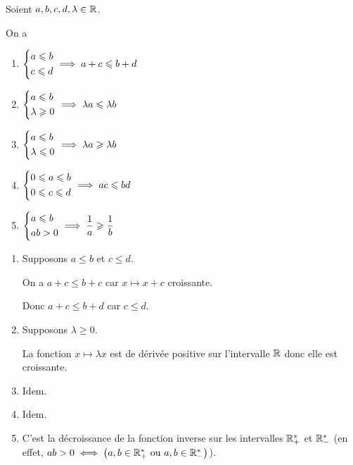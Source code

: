 \begin{prop}
Soient \(a,b,c,d,\lambda\in\mathbb{R}\).

On a \begin{enumerate}
\item \(\begin{dcases}a\leqslant b \\ c\leqslant d\end{dcases}\implies a+c\leqslant b+d\)

\item \(\begin{dcases}a\leqslant b \\ \lambda\geqslant0\end{dcases}\implies\lambda a\leqslant\lambda b\)

\item \(\begin{dcases}a\leqslant b \\ \lambda\leqslant0\end{dcases}\implies\lambda a\geqslant\lambda b\)

\item \(\begin{dcases}0\leqslant a\leqslant b \\ 0\leqslant c\leqslant d\end{dcases}\implies ac\leqslant bd\)

\item \(\begin{dcases}a\leqslant b \\ ab>0\end{dcases}\implies\dfrac{1}{a}\geqslant\dfrac{1}{b}\)
\end{enumerate}
\end{prop}

\begin{dem}
\begin{enumerate}
\item Supposons \(a\leq b\) et \(c\leq d\).

On a \(a+c\leq b+c\) car \(x\mapsto x+c\) croissante.

Donc \(a+c\leq b+d\) car \(c\leq d\).

\item Supposons \(\lambda\geq0\).

La fonction \(x\mapsto\lambda x\) est de dérivée positive sur l'intervalle \(\mathbb{R}\) donc elle est croissante.

\item Idem.

\item Idem.

\item C'est la décroissance de la fonction inverse sur les intervalles \(\mathbb{R}_+^*\) et \(\mathbb{R}_-^*\) (en effet, \(ab>0\iff\left(a,b\in\mathbb{R}_+^*\text{ ou }a,b\in\mathbb{R}_-^*\right)\)).
\end{enumerate}
\end{dem}

